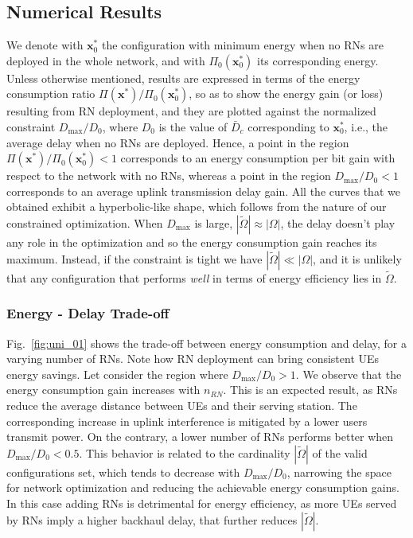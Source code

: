 \documentclass[draftcls,onecolumn]{IEEEtran}
\theoremstyle{plain}
\theoremstyle{definition}
\begin{document}
\subsection{Numerical Results}
We denote with $\boldsymbol{x}^*_{0}$ the configuration with minimum energy when no RNs are deployed in the whole network, and with $\Pi_0(\boldsymbol{x}^*_{0})$ its corresponding energy. 
Unless otherwise mentioned, results are expressed in terms of the energy consumption ratio $\Pi (\boldsymbol{x}^*) / \Pi_0(\boldsymbol{x}^*_{0})$, so as to show the energy gain (or loss) resulting from RN deployment, and they are plotted against the normalized constraint $D_{\max}/D_0$, where $D_0$ is the value of $\bar{D}_c$ corresponding to $\boldsymbol{x}^*_{0}$, i.e., the average delay when no RNs are deployed. 
Hence, a point in the region $\Pi(\boldsymbol{x}^*) / \Pi_0(\boldsymbol{x}^*_{0}){<}1$ corresponds to an energy consumption per bit gain with respect to the network with no RNs, whereas a point in the region $D_{\max}/D_0{<}1$ corresponds to an average uplink transmission delay gain. All the curves that we obtained exhibit a hyperbolic-like shape, which follows from the nature of our constrained optimization. When $D_{\max}$ is large, $| \tilde{\Omega}| \approx |\Omega|$, the delay doesn't play any role in the optimization and so the energy consumption gain reaches its maximum. 
Instead, if the constraint is tight we have $| \tilde{\Omega}| \ll |\Omega|$, and it is unlikely that any configuration that performs {\it well} in terms of energy efficiency lies in $\tilde{\Omega}$. 


\subsubsection{Energy - Delay Trade-off}
Fig.~\ref{fig:uni_01} shows the trade-off between energy consumption and delay, for a varying number of RNs. Note how RN deployment can bring consistent UEs energy savings.
Let consider the region where $D_{\max}/D_0{>}1$. We observe that the energy consumption gain increases with $n_{RN}$. 
This is an expected result, as RNs reduce the average distance between UEs and their serving station. The corresponding increase in uplink interference is mitigated by a lower users transmit power. On the contrary, a lower number of RNs performs better when $D_{\max}/D_0<0.5$. This behavior is related to the cardinality $|\tilde{\Omega}|$ of the valid configurations set, which tends to decrease with $D_{\max}/D_0$, narrowing the space for network optimization and reducing the achievable energy consumption gains. In this case adding RNs is detrimental for energy efficiency, as more UEs served by RNs imply a higher backhaul delay, that further reduces $|\tilde{\Omega}|$.  
\end{document}
